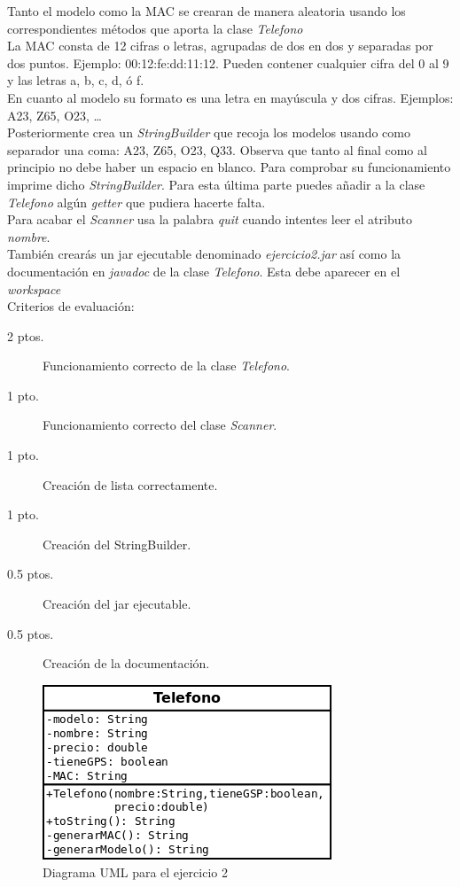 \documentclass[addpoints,12pt]{exam}
\begin{document}
\begin{questions}
Tanto el modelo como la MAC se crearan de manera aleatoria usando los correspondientes métodos que aporta la clase \emph{Telefono}\\
La MAC consta de 12 cifras o letras, agrupadas de dos en dos y separadas por dos puntos. Ejemplo: 00:12:fe:dd:11:12. Pueden contener cualquier cifra del 0 al 9 y las letras a, b, c, d, ó f.\\
En cuanto al modelo su formato es una letra en mayúscula y dos cifras. Ejemplos: A23, Z65, O23, \dots\\
Posteriormente crea un \emph{StringBuilder} que recoja los modelos usando como separador una coma: A23, Z65, O23, Q33. Observa que tanto al final como al principio no debe haber un espacio en blanco. Para comprobar su funcionamiento imprime dicho \emph{StringBuilder}.
Para esta última parte puedes añadir a la clase \emph{Telefono} algún \emph{getter} que pudiera hacerte falta.\\
Para acabar el \emph{Scanner} usa la palabra \emph{quit} cuando intentes leer el atributo \emph{nombre}.\\
También crearás un jar ejecutable denominado \emph{ejercicio2.jar} así como la documentación en \emph{javadoc} de la clase \emph{Telefono}. Esta debe aparecer en el \emph{workspace}
\vspace{0.3cm}
\\
Criterios de evaluación:
\begin{description}
\item[2 ptos.] Funcionamiento correcto de la clase \emph{Telefono}.
\item[1 pto.] Funcionamiento correcto del clase \emph{Scanner}.
\item[1 pto.] Creación de lista correctamente.
\item[1 pto.] Creación del StringBuilder.
\item[0.5 ptos.] Creación del jar ejecutable.
\item[0.5 ptos.] Creación de la documentación. 
\end{description}
\begin{figure}[h]
\centering
\includegraphics[scale=0.5]{telefono.png}
\caption{Diagrama UML para el ejercicio 2}
\end{figure}
\end{questions}
\end{document}
